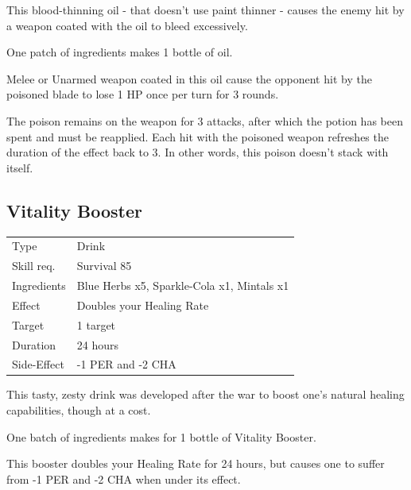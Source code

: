 \documentclass[11pt,a4paper,twocolumn]{book}
\begin{document}
\medskip

This blood-thinning oil - that doesn't use paint thinner - causes the enemy hit by a weapon coated with the oil to bleed excessively.

One patch of ingredients makes 1 bottle of oil.

Melee or Unarmed weapon coated in this oil cause the opponent hit by the poisoned blade to lose 1 HP once per turn for 3 rounds.

The poison remains on the weapon for 3 attacks, after which the potion has been spent and must be reapplied. Each hit with the poisoned weapon refreshes the duration of the effect back to 3. In other words, this poison doesn't stack with itself.


\subsection*{Vitality Booster}
{
	\begin{tabu} to 75mm{| X[l,4] | X[l,8] |}
		\hline
		Type 			& Drink 													\\
        Skill req.	    & Survival 85 												\\
        Ingredients     & Blue Herbs x5, Sparkle-Cola x1, Mintals x1				\\
        Effect     		& Doubles your Healing Rate 								\\
        Target      	& 1 target													\\
        Duration  		& 24 hours	 												\\
        Side-Effect     & -1 PER and -2 CHA											\\ \hline
	\end{tabu}
		
}

\medskip

This tasty, zesty drink was developed after the war to boost one's natural healing capabilities, though at a cost.

One batch of ingredients makes for 1 bottle of Vitality Booster.

This booster doubles your Healing Rate for 24 hours, but causes one to suffer from -1 PER and -2 CHA when under its effect.
\end{document}
